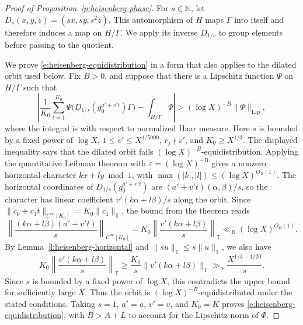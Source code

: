 \documentclass[12pt]{amsart}
\newcommand{\1}{\mathbf 1}
\theoremstyle{definition}
\begin{document}
\begin{proof}[Proof of Proposition~\ref{p:heisenberg-phase}]
For \(s\in\mathbb N\), let \(D_s(x,y,z)=(sx,sy,s^2z)\).
This automorphism of \(H\) maps \(\Gamma\) into itself and
therefore induces a map on \(H/\Gamma\). We apply its inverse
\(D_{1/s}\) to group elements before passing to the quotient.

We prove \eqref{e:heisenberg-equidistribution} in a form that
also applies to the dilated orbit used below. Fix \(B>0\), and
suppose that there is a Lipschitz function \(\Psi\) on \(H/\Gamma\)
such that
\[
 \left|
 \frac1{K_0}\sum_{t=1}^{K_0}
 \Psi\bigl(D_{1/s}(g_0^{a'+v't})\Gamma\bigr)
 -\int_{H/\Gamma}\Psi
 \right|
 >(\log X)^{-B}\|\Psi\|_{\mathrm{Lip}},
\]
where the integral is with respect to normalized Haar measure.
Here \(s\) is bounded by a fixed power of \(\log X\),
\(1\leq v'\leq X^{1/5000}\), \(r_j\nmid v'\), and
\(K_0\geq X^{1/3}\). The displayed inequality says that the
dilated orbit fails \((\log X)^{-B}\)-equidistribution. Applying the quantitative Leibman theorem
\cite[Theorem~2.9]{GreenTaoNil} with
\(\varepsilon=(\log X)^{-B}\) gives a nonzero horizontal character
\(kx+ly\bmod 1\), with \(\max(|k|,|l|)\leq(\log X)^{O_B(1)}\).
The horizontal coordinates of \(D_{1/s}(g_0^{a'+v't})\) are
\((a'+v't)(\alpha,\beta)/s\), so the character has linear
coefficient \(v'(k\alpha+l\beta)/s\) along the orbit. Since
\(\|c_0+c_1t\|_{C^\infty[K_0]}=K_0\|c_1\|_{\mathbb T}\), the
bound from the theorem reads
\[
 \left\|\frac{(k\alpha+l\beta)(a'+v't)}{s}\right\|_{C^\infty[K_0]}
 =K_0\left\|\frac{v'(k\alpha+l\beta)}{s}\right\|_{\mathbb T}
 \ll_B(\log X)^{O_B(1)}.
\]
By Lemma~\ref{l:heisenberg-horizontal} and
\(\|su\|_{\mathbb T}\leq s\|u\|_{\mathbb T}\), we also have
\[
 K_0\left\|\frac{v'(k\alpha+l\beta)}{s}\right\|_{\mathbb T}
 \geq \frac{K_0}{s}\|v'(k\alpha+l\beta)\|_{\mathbb T}
 \gg_\alpha \frac{X^{1/3-1/20}}{s}.
\]
Since \(s\) is bounded by a fixed power of \(\log X\), this
contradicts the upper bound for sufficiently large \(X\). Thus
the orbit is \((\log X)^{-B}\)-equidistributed under the stated
conditions. Taking \(s=1\), \(a'=a\), \(v'=v\), and \(K_0=K\)
proves \eqref{e:heisenberg-equidistribution}, with \(B>A+L\) to
account for the Lipschitz norm of \(\Phi\).


\end{proof}
\end{document}
